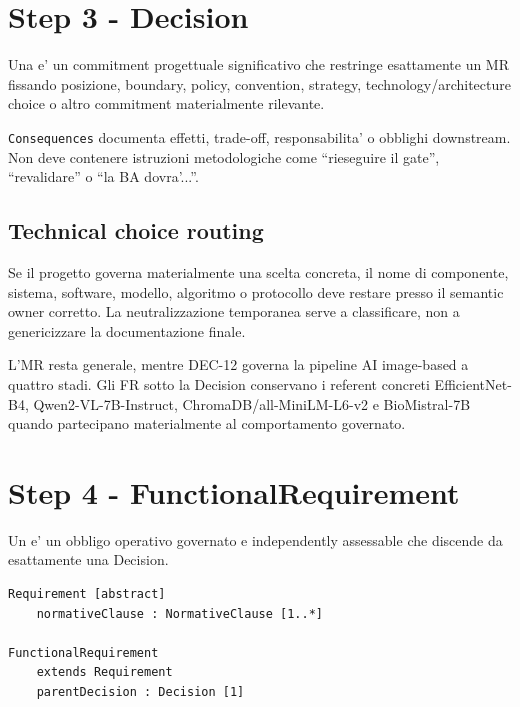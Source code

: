 \documentclass[11pt,a4paper]{article}
\begin{document}
\section{Step 3 - Decision}
\closedtag

Una \DEC{} e' un commitment progettuale significativo che restringe esattamente un MR fissando posizione, boundary, policy, convention, strategy, technology/architecture choice o altro commitment materialmente rilevante.

\begin{ddtacore}[title={Consequences descrive il sistema}]
\texttt{Consequences} documenta effetti, trade-off, responsabilita' o obblighi downstream. Non deve contenere istruzioni metodologiche come ``rieseguire il gate'', ``revalidare'' o ``la BA dovra'...''.
\end{ddtacore}

\subsection{Technical choice routing}
\holdouttag
Se il progetto governa materialmente una scelta concreta, il nome di componente, sistema, software, modello, algoritmo o protocollo deve restare presso il semantic owner corretto. La neutralizzazione temporanea serve a classificare, non a genericizzare la documentazione finale.

\begin{ddtaexample}[title={DermaTriage DEC-12}]
L'MR resta generale, mentre DEC-12 governa la pipeline AI image-based a quattro stadi. Gli FR sotto la Decision conservano i referent concreti EfficientNet-B4, Qwen2-VL-7B-Instruct, ChromaDB/all-MiniLM-L6-v2 e BioMistral-7B quando partecipano materialmente al comportamento governato.
\end{ddtaexample}

\section{Step 4 - FunctionalRequirement}
\closedtag

Un \FR{} e' un obbligo operativo governato e independently assessable che discende da esattamente una Decision.

\begin{lstlisting}
Requirement [abstract]
    normativeClause : NormativeClause [1..*]

FunctionalRequirement
    extends Requirement
    parentDecision : Decision [1]
\end{lstlisting}
\end{document}
